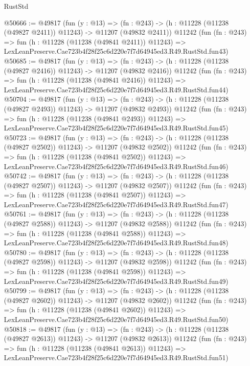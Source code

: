 \begin{lexlean}{RustStd}
\begin{coremodule}
@50666 := @49817
    (fun (y : @13) =>
    (fn : @243) -> (h : @11228 (@11238 (@49827 @2411)) @11243) -> @11207 (@49832 @2411))
    @11242
    (fun (fn : @243) =>
    fun (h : @11228 (@11238 (@49841 @2411)) @11243) =>
    LexLeanPreserve.Cae723b4f28f25c6d220e7f7d64945ed3.R49.RustStd.fun43)
@50685 := @49817
    (fun (y : @13) =>
    (fn : @243) -> (h : @11228 (@11238 (@49827 @2416)) @11243) -> @11207 (@49832 @2416))
    @11242
    (fun (fn : @243) =>
    fun (h : @11228 (@11238 (@49841 @2416)) @11243) =>
    LexLeanPreserve.Cae723b4f28f25c6d220e7f7d64945ed3.R49.RustStd.fun44)
@50704 := @49817
    (fun (y : @13) =>
    (fn : @243) -> (h : @11228 (@11238 (@49827 @2493)) @11243) -> @11207 (@49832 @2493))
    @11242
    (fun (fn : @243) =>
    fun (h : @11228 (@11238 (@49841 @2493)) @11243) =>
    LexLeanPreserve.Cae723b4f28f25c6d220e7f7d64945ed3.R49.RustStd.fun45)
@50723 := @49817
    (fun (y : @13) =>
    (fn : @243) -> (h : @11228 (@11238 (@49827 @2502)) @11243) -> @11207 (@49832 @2502))
    @11242
    (fun (fn : @243) =>
    fun (h : @11228 (@11238 (@49841 @2502)) @11243) =>
    LexLeanPreserve.Cae723b4f28f25c6d220e7f7d64945ed3.R49.RustStd.fun46)
@50742 := @49817
    (fun (y : @13) =>
    (fn : @243) -> (h : @11228 (@11238 (@49827 @2507)) @11243) -> @11207 (@49832 @2507))
    @11242
    (fun (fn : @243) =>
    fun (h : @11228 (@11238 (@49841 @2507)) @11243) =>
    LexLeanPreserve.Cae723b4f28f25c6d220e7f7d64945ed3.R49.RustStd.fun47)
@50761 := @49817
    (fun (y : @13) =>
    (fn : @243) -> (h : @11228 (@11238 (@49827 @2588)) @11243) -> @11207 (@49832 @2588))
    @11242
    (fun (fn : @243) =>
    fun (h : @11228 (@11238 (@49841 @2588)) @11243) =>
    LexLeanPreserve.Cae723b4f28f25c6d220e7f7d64945ed3.R49.RustStd.fun48)
@50780 := @49817
    (fun (y : @13) =>
    (fn : @243) -> (h : @11228 (@11238 (@49827 @2598)) @11243) -> @11207 (@49832 @2598))
    @11242
    (fun (fn : @243) =>
    fun (h : @11228 (@11238 (@49841 @2598)) @11243) =>
    LexLeanPreserve.Cae723b4f28f25c6d220e7f7d64945ed3.R49.RustStd.fun49)
@50799 := @49817
    (fun (y : @13) =>
    (fn : @243) -> (h : @11228 (@11238 (@49827 @2602)) @11243) -> @11207 (@49832 @2602))
    @11242
    (fun (fn : @243) =>
    fun (h : @11228 (@11238 (@49841 @2602)) @11243) =>
    LexLeanPreserve.Cae723b4f28f25c6d220e7f7d64945ed3.R49.RustStd.fun50)
@50818 := @49817
    (fun (y : @13) =>
    (fn : @243) -> (h : @11228 (@11238 (@49827 @2613)) @11243) -> @11207 (@49832 @2613))
    @11242
    (fun (fn : @243) =>
    fun (h : @11228 (@11238 (@49841 @2613)) @11243) =>
    LexLeanPreserve.Cae723b4f28f25c6d220e7f7d64945ed3.R49.RustStd.fun51)

\end{coremodule}
\end{lexlean}
